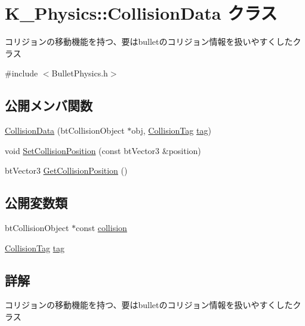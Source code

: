 \hypertarget{class_k___physics_1_1_collision_data}{}\section{K\+\_\+\+Physics\+:\+:Collision\+Data クラス}
\label{class_k___physics_1_1_collision_data}


コリジョンの移動機能を持つ、要はbulletのコリジョン情報を扱いやすくしたクラス  




{\ttfamily \#include $<$Bullet\+Physics.\+h$>$}

\subsection*{公開メンバ関数}
\begin{DoxyCompactItemize}
\item 
\mbox{\hyperlink{class_k___physics_1_1_collision_data_abc664918f597d9ef7ccc00530d6f9c5c}{Collision\+Data}} (bt\+Collision\+Object $\ast$obj, \mbox{\hyperlink{struct_k___physics_1_1_collision_tag}{Collision\+Tag}} \mbox{\hyperlink{class_k___physics_1_1_collision_data_aca2f02c2b5deed664630c0a04c4f2b1f}{tag}})
\item 
void \mbox{\hyperlink{class_k___physics_1_1_collision_data_ae62b85485120979ffbc0be94b371ed5a}{Set\+Collision\+Position}} (const bt\+Vector3 \&position)
\item 
bt\+Vector3 \mbox{\hyperlink{class_k___physics_1_1_collision_data_a2f9a7ee59434120e3d18f66af035db7b}{Get\+Collision\+Position}} ()
\end{DoxyCompactItemize}
\subsection*{公開変数類}
\begin{DoxyCompactItemize}
\item 
bt\+Collision\+Object $\ast$const \mbox{\hyperlink{class_k___physics_1_1_collision_data_a45dc4d1f2a85cef93993b2872c49fc49}{collision}}
\item 
\mbox{\hyperlink{struct_k___physics_1_1_collision_tag}{Collision\+Tag}} \mbox{\hyperlink{class_k___physics_1_1_collision_data_aca2f02c2b5deed664630c0a04c4f2b1f}{tag}}
\end{DoxyCompactItemize}


\subsection{詳解}
コリジョンの移動機能を持つ、要はbulletのコリジョン情報を扱いやすくしたクラス 

